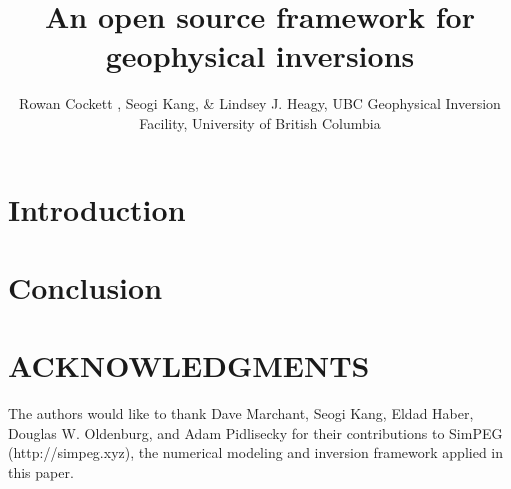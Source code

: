 \documentclass{segabs}
\begin{document}
\title{An open source framework for geophysical inversions}

\renewcommand{\thefootnote}{\fnsymbol{footnote}}

\author{Rowan Cockett \footnotemark[1], Seogi Kang, \& Lindsey J. Heagy, UBC Geophysical Inversion Facility, University of British Columbia}


\maketitle

\begin{abstract}

\end{abstract}

\vspace{-5pt}
\section{Introduction}
\vspace{-3pt}




\vspace{-5pt}
\section*{Conclusion}
\vspace{-3pt}



\vspace{-5pt}
\section{ACKNOWLEDGMENTS}
\vspace{-3pt}
The authors would like to thank Dave Marchant, Seogi Kang, Eldad Haber, Douglas W. Oldenburg, and Adam Pidlisecky for their contributions to SimPEG \\ (http://simpeg.xyz), the numerical modeling and inversion framework applied in this paper.

\onecolumn


\end{document}
